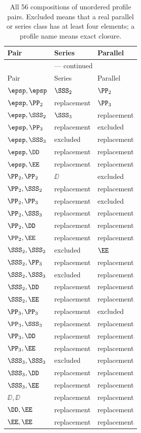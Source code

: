 \begingroup\renewcommand{\arraystretch}{1.25}
\begin{longtable}{lll}
\caption{All 56 compositions of unordered profile pairs. Excluded means that a real parallel or series class has at least four elements; a profile name means exact closure.}\label{tab:composition}\\
\toprule
Pair & Series & Parallel\\ \midrule
\endfirsthead
\multicolumn{3}{c}{\tablename~\thetable{} --- continued}\\[3pt]
\toprule
Pair & Series & Parallel\\ \midrule
\endhead
$\epsp,\epsp$ & $\SSS_2$ & $\PP_2$ \\
$\epsp,\PP_2$ & replacement & $\PP_3$ \\
$\epsp,\SSS_2$ & $\SSS_3$ & replacement \\
$\epsp,\PP_3$ & replacement & excluded \\
$\epsp,\SSS_3$ & excluded & replacement \\
$\epsp,\DD$ & replacement & replacement \\
$\epsp,\EE$ & replacement & replacement \\
$\PP_2,\PP_2$ & $\DD$ & excluded \\
$\PP_2,\SSS_2$ & replacement & replacement \\
$\PP_2,\PP_3$ & replacement & excluded \\
$\PP_2,\SSS_3$ & replacement & replacement \\
$\PP_2,\DD$ & replacement & replacement \\
$\PP_2,\EE$ & replacement & replacement \\
$\SSS_2,\SSS_2$ & excluded & $\EE$ \\
$\SSS_2,\PP_3$ & replacement & replacement \\
$\SSS_2,\SSS_3$ & excluded & replacement \\
$\SSS_2,\DD$ & replacement & replacement \\
$\SSS_2,\EE$ & replacement & replacement \\
$\PP_3,\PP_3$ & replacement & excluded \\
$\PP_3,\SSS_3$ & replacement & replacement \\
$\PP_3,\DD$ & replacement & replacement \\
$\PP_3,\EE$ & replacement & replacement \\
$\SSS_3,\SSS_3$ & excluded & replacement \\
$\SSS_3,\DD$ & replacement & replacement \\
$\SSS_3,\EE$ & replacement & replacement \\
$\DD,\DD$ & replacement & replacement \\
$\DD,\EE$ & replacement & replacement \\
$\EE,\EE$ & replacement & replacement \\
\bottomrule
\end{longtable}
\endgroup
